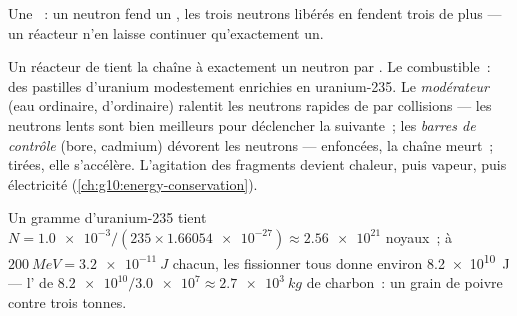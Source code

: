 \begin{omfigure}

{\small Une ~: un neutron fend un
, les trois neutrons libérés en fendent
trois de plus --- un réacteur n'en laisse continuer qu'exactement un.}
\end{omfigure}

\begin{definition}\label{def:g12:nuclear-energy:reactor}
Un réacteur de  tient la chaîne à exactement un
neutron par . Le combustible~: des pastilles
d'uranium modestement enrichies en uranium-235. Le
\emph{modérateur} (eau ordinaire, d'ordinaire)
ralentit les neutrons rapides de  par
collisions --- les neutrons lents sont bien meilleurs pour déclencher
la  suivante~; les \emph{barres de
contrôle} (bore, cadmium) dévorent les
neutrons --- enfoncées, la chaîne meurt~; tirées, elle s'accélère.
L'agitation des fragments devient chaleur, puis vapeur, puis
électricité (\cref{ch:g10:energy-conservation}).
\end{definition}

\begin{example}\label{ex:g12:nuclear-energy:gram}
Un gramme d'uranium-235 tient
$N = \num{1.0e-3} / (235 \times \num{1.66054e-27}) \approx \num{2.56e21}$
noyaux~; à $\qty{200}{MeV} = \qty{3.2e-11}{J}$ chacun, les fissionner
tous donne environ \qty{8.2e10}{J} --- l' de $\num{8.2e10} / \num{3.0e7} \approx \qty{2.7e3}{kg}$ de
charbon~: un grain de poivre contre trois tonnes.
\end{example}

